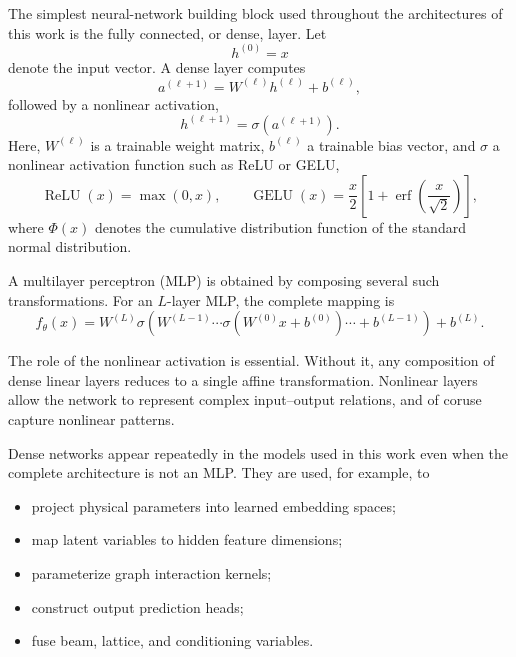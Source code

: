 The simplest neural-network building block used throughout the architectures of this work is the fully connected, or dense, layer. Let
\begin{equation}
    h^{(0)}=x
\end{equation}
denote the input vector. A dense layer computes
\begin{equation}
    a^{(\ell+1)}
    =
    W^{(\ell)}h^{(\ell)}
    +
    b^{(\ell)},
\end{equation}
followed by a nonlinear activation,
\begin{equation}
    h^{(\ell+1)}
    =
    \sigma
    \left(
    a^{(\ell+1)}
    \right).
    \label{eq:dense_layer_basic}
\end{equation}
Here,
$W^{(\ell)}$
is a trainable weight matrix,
$b^{(\ell)}$
a trainable bias vector, and
$\sigma$
a nonlinear activation function such as ReLU or GELU,
\begin{equation}
    \operatorname{ReLU}(x)
    =
    \max(0,x),
    \qquad
    \operatorname{GELU}(x)
    =
    \frac{x}{2}
    \left[
        1
        +
        \operatorname{erf}
        \left(
            \frac{x}{\sqrt{2}}
        \right)
    \right],
\end{equation}
where $\Phi(x)$ denotes the cumulative distribution function of the standard normal distribution.

A multilayer perceptron (MLP) is obtained by composing several such transformations. For an $L$-layer MLP, the complete mapping is
\begin{equation}
    f_{\theta}(x)
    =
    W^{(L)}
    \sigma
    \left(
    W^{(L-1)}
    \cdots
    \sigma
    \left(
    W^{(0)}x+b^{(0)}
    \right)
    \cdots
    +
    b^{(L-1)}
    \right)
    +
    b^{(L)}.
    \label{eq:mlp_basic}
\end{equation}

The role of the nonlinear activation is essential. Without it, any composition of dense linear layers reduces to a single affine transformation. Nonlinear layers allow the network to represent complex input--output relations, and of coruse capture nonlinear patterns.

Dense networks appear repeatedly in the models used in this work even when the complete architecture is not an MLP. They are used, for example, to 
\begin{itemize}
    \item project physical parameters into learned embedding spaces;
    \item map latent variables to hidden feature dimensions;
    \item parameterize graph interaction kernels;
    \item construct output prediction heads;
    \item fuse beam, lattice, and conditioning variables.
\end{itemize}

